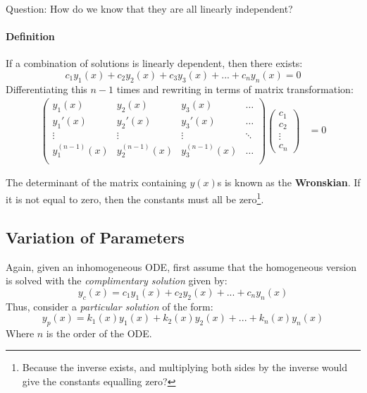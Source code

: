 \documentclass[12pt]{article}
\begin{document}
Question: How do we know that they are all linearly independent?

\paragraph{Definition}
If a combination of solutions is linearly dependent, then there exists:
\[ c_1y_1(x) + c_2y_2(x) + c_3y_3(x)+...+c_ny_n(x) = 0\]
Differentiating this $n-1$ times and rewriting in terms of matrix transformation:
\begin{align*}
    \begin{pmatrix}
    y_1(x) & y_2(x) & y_3(x)&\dots\\
    y_1'(x)& y_2'(x) & y_3'(x)&\dots\\
    \vdots&\vdots&\vdots&\ddots\\
    y_1^{(n-1)}(x) & y_2^{(n-1)}(x) & y_3^{(n-1)}(x)&\dots\\
    \end{pmatrix} 
    \begin{pmatrix}
    c_1\\c_2\\\vdots\\c_n
    \end{pmatrix}&=0
\end{align*}

The determinant of the matrix containing $y(x)$s is known as the \textbf{Wronskian}. If it is not equal to zero, then the constants must all be zero\footnote{Because the inverse exists, and multiplying both sides by the inverse would give the constants equalling zero?}.

\subsection{Variation of Parameters}
Again, given an inhomogeneous ODE, first assume that the homogeneous version is solved with the \textit{complimentary solution} given by:
\[y_c(x) = c_1y_1(x)+c_2y_2(x)+...+c_ny_n(x)\]
Thus, consider a \textit{particular solution} of the form:
\[y_p(x) = k_1(x)y_1(x)+k_2(x)y_2(x)+...+k_n(x)y_n(x)\]
Where $n$ is the order of the ODE.
\end{document}
